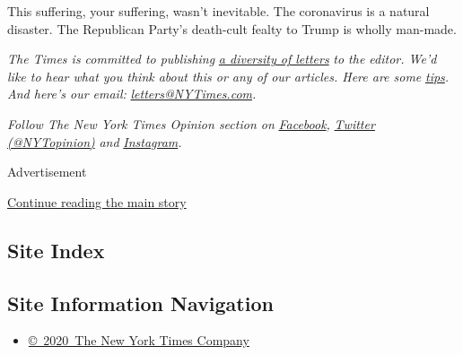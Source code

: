 This suffering, your suffering, wasn't inevitable. The coronavirus is a
natural disaster. The Republican Party's death-cult fealty to Trump is
wholly man-made.

\emph{The Times is committed to publishing}
\href{https://www.nytimes3xbfgragh.onion/2019/01/31/opinion/letters/letters-to-editor-new-york-times-women.html}{\emph{a
diversity of letters}} \emph{to the editor. We'd like to hear what you
think about this or any of our articles. Here are some}
\href{https://help.nytimes3xbfgragh.onion/hc/en-us/articles/115014925288-How-to-submit-a-letter-to-the-editor}{\emph{tips}}\emph{.
And here's our email:}
\href{mailto:letters@NYTimes.com}{\emph{letters@NYTimes.com}}\emph{.}

\emph{Follow The New York Times Opinion section on}
\href{https://www.facebookcorewwwi.onion/nytopinion}{\emph{Facebook}}\emph{,}
\href{http://twitter.com/NYTOpinion}{\emph{Twitter (@NYTopinion)}}
\emph{and}
\href{https://www.instagram.com/nytopinion/}{\emph{Instagram}}\emph{.}

Advertisement

\protect\hyperlink{after-bottom}{Continue reading the main story}

\hypertarget{site-index}{%
\subsection{Site Index}\label{site-index}}

\hypertarget{site-information-navigation}{%
\subsection{Site Information
Navigation}\label{site-information-navigation}}

\begin{itemize}
\tightlist
\item
  \href{https://help.nytimes3xbfgragh.onion/hc/en-us/articles/115014792127-Copyright-notice}{©~2020~The
  New York Times Company}
\end{itemize}

